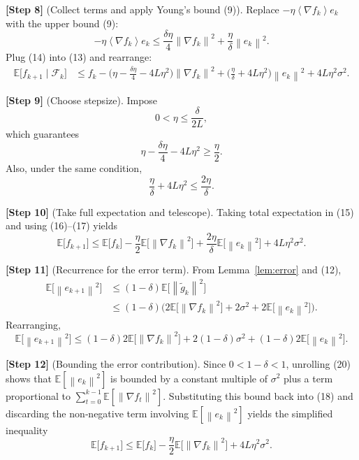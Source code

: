 \documentclass[11pt]{article}
\newcommand{\E}{\mathbb{E}}
\newcommand{\norm}[1]{\left\|#1\right\|}
\newcommand{\inner}[1]{\left\langle #1 \right\rangle}
\begin{document}
\noindent\textbf{[Step 8]} (Collect terms and apply Young’s bound (9)).  
Replace $-\eta\inner{\nabla f_{k}}{e_{k}}$ with the upper bound (9):
\[
-\eta\inner{\nabla f_{k}}{e_{k}}
\le \frac{\delta\eta}{4}\norm{\nabla f_{k}}^{2}
+\frac{\eta}{\delta}\norm{e_{k}}^{2}.
\tag{14}
\]
Plug (14) into (13) and rearrange:
\[
\begin{aligned}
\E\!\big[f_{k+1}\mid\mathcal{F}_{k}\big]
&\le f_{k}
-\Big(\eta-\frac{\delta\eta}{4}-4L\eta^{2}\Big)\norm{\nabla f_{k}}^{2}
+\Big(\frac{\eta}{\delta}+4L\eta^{2}\Big)\norm{e_{k}}^{2}
+4L\eta^{2}\sigma^{2}.
\end{aligned}
\tag{15}
\]

\noindent\textbf{[Step 9]} (Choose stepsize). Impose
\[
0<\eta\le\frac{\delta}{2L},
\]
which guarantees
\[
\eta-\frac{\delta\eta}{4}-4L\eta^{2}
\ge \frac{\eta}{2}. \tag{16}
\]
Also, under the same condition,
\[
\frac{\eta}{\delta}+4L\eta^{2}\le\frac{2\eta}{\delta}. \tag{17}
\]

\noindent\textbf{[Step 10]} (Take full expectation and telescope). Taking total expectation in (15) and using (16)–(17) yields
\[
\E\!\big[f_{k+1}\big]\le \E\!\big[f_{k}\big]
-\frac{\eta}{2}\E\!\big[\norm{\nabla f_{k}}^{2}\big]
+\frac{2\eta}{\delta}\E\!\big[\norm{e_{k}}^{2}\big]
+4L\eta^{2}\sigma^{2}. \tag{18}
\]

\noindent\textbf{[Step 11]} (Recurrence for the error term). From Lemma~\ref{lem:error} and (12),
\[
\begin{aligned}
\E\!\big[\norm{e_{k+1}}^{2}\big]
&\le (1-\delta)\E\!\big[\norm{\tilde g_{k}}^{2}\big]\\
&\le (1-\delta)\Big(2\E\!\big[\norm{\nabla f_{k}}^{2}\big]+2\sigma^{2}+2\E\!\big[\norm{e_{k}}^{2}\big]\Big).
\end{aligned}
\tag{19}
\]
Rearranging,
\[
\E\!\big[\norm{e_{k+1}}^{2}\big]\le (1-\delta)2\E\!\big[\norm{\nabla f_{k}}^{2}\big]
+2(1-\delta)\sigma^{2}+(1-\delta)2\E\!\big[\norm{e_{k}}^{2}\big].
\tag{20}
\]

\noindent\textbf{[Step 12]} (Bounding the error contribution). Since $0<1-\delta<1$, unrolling (20) shows that $\E[\norm{e_{k}}^{2}]$ is bounded by a constant multiple of $\sigma^{2}$ plus a term proportional to $\sum_{t=0}^{k-1}\E[\norm{\nabla f_{t}}^{2}]$. Substituting this bound back into (18) and discarding the non‑negative term involving $\E[\norm{e_{k}}^{2}]$ yields the simplified inequality
\[
\E\!\big[f_{k+1}\big]\le \E\!\big[f_{k}\big]
-\frac{\eta}{2}\E\!\big[\norm{\nabla f_{k}}^{2}\big]
+4L\eta^{2}\sigma^{2}. \tag{21}
\]
\end{document}
